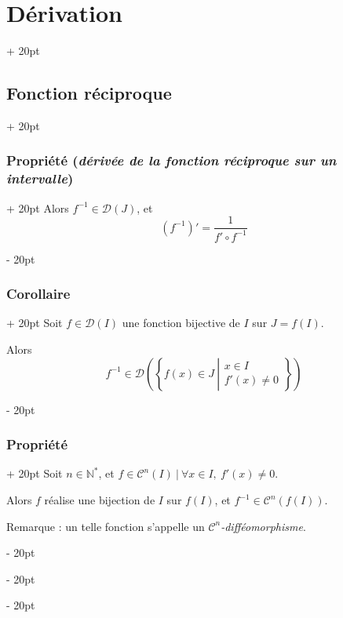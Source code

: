 \documentclass[a4paper, 12pt, twoside]{article}
\newcommand{\N}{\mathbb{N}} %
\newcommand{\lr}[1]{\left( #1 \right)}
\newcommand{\set}[1]{\left\{ #1 \right\}}
\newcommand{\ind}[1][20pt]{\advance\leftskip + #1}
\newcommand{\deind}[1][20pt]{\advance\leftskip - #1}
\newenvironment{indt}[2][20pt]{#2 \par \ind[#1]}{\par \deind} %
\begin{document}
\begin{indt}{\section{Dérivation}}
\begin{indt}{\subsection{Fonction réciproque}}
\begin{indt}{\subsubsection{Propriété (\textit{dérivée de la fonction réciproque sur un intervalle})}}
                Alors $f^{-1} \in \mathcal D(J)$, et
                \[
                    \lr{f^{-1}}' = \dfrac{1}{f' \circ f^{-1}}
                \]
            \end{indt}

            \vspace{12pt}
            
            \begin{indt}{\subsubsection{Corollaire}}
                Soit $f \in \mathcal D(I)$ une fonction bijective de $I$ sur $J = f(I)$.

                Alors
                \[
                    f^{-1} \in \mathcal D\!\lr{\set{
                        f(x) \in J\
                        \left|
                        \begin{array}{l}
                            x \in I
                            \\
                            f'(x) \neq 0
                        \end{array}
                        \right.
                    }}
                \]
            \end{indt}

            \vspace{12pt}
            
            \begin{indt}{\subsubsection{Propriété}}
                Soit $n \in \N^*$, et $f \in \mathcal C^n(I)\ |\ \forall x \in I,\ f'(x) \neq 0$.

                Alors $f$ réalise une bijection de $I$ sur $f(I)$, et $f^{-1} \in \mathcal C^n(f(I))$.

                \vspace{6pt}
                
                Remarque : un telle fonction s'appelle un \textit{$\mathcal C^n$-difféomorphisme}.
            \end{indt}
        \end{indt}

        \vspace{12pt}
        

\end{indt}
\end{document}
